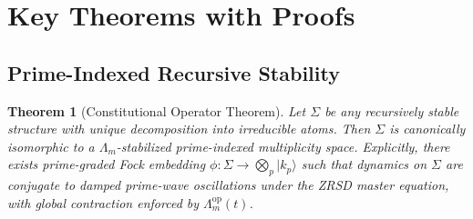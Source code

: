 \documentclass[12pt]{amsart}
\theoremstyle{plain}
\newtheorem{theorem}{Theorem}[section]
\begin{document}
\section{Key Theorems with Proofs}\label{sec:proofs}

\subsection{Prime-Indexed Recursive Stability}

\begin{theorem}[Constitutional Operator Theorem]\label{thm:stability}
Let \(\Sigma\) be any recursively stable structure with unique decomposition into irreducible atoms. Then \(\Sigma\) is canonically isomorphic to a \(\Lambda_m\)-stabilized prime-indexed multiplicity space. Explicitly, there exists prime-graded Fock embedding \(\phi: \Sigma \to \bigotimes_p |k_p\rangle\) such that dynamics on \(\Sigma\) are conjugate to damped prime-wave oscillations under the ZRSD master equation, with global contraction enforced by \(\Lambda_m^{\text{op}}(t)\).
\end{theorem}
\end{document}

